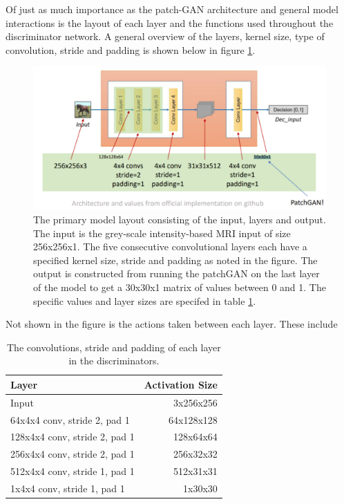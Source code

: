 \documentclass[12pt, fleqn, titlepage]{article}
\begin{document}
Of just as much importance as the patch-GAN architecture and general model interactions is the layout of each layer and the functions used throughout the discriminator network. A general overview of the layers, kernel size, type of convolution, stride and padding is shown below in figure \ref{fig:cyclegandiscriminatorlayers}.
\begin{figure}[H]
	\centering
	\includegraphics[width=0.7\linewidth]{imgs/cyclegan_discriminator_layers}
	\caption{The primary model layout consisting of the input, layers and output. The input is the grey-scale intensity-based MRI input of size 256x256x1. The five consecutive convolutional layers each have a specified kernel size, stride and padding as noted in the figure. The output is constructed from running the patchGAN on the last layer of the model to get a 30x30x1 matrix of values between 0 and 1. The specific values and layer sizes are specifed in table \ref{discriminator_layers}.} %
	\label{fig:cyclegandiscriminatorlayers}
\end{figure}

Not shown in the figure is the actions taken between each layer. These include 

\begin{table}[H]\label{discriminator_layers}
	\centering
	\begin{tabular}{lr}\toprule
		Layer                         & Activation Size \\ \midrule
		Input                         & 3x256x256       \\
		64x4x4 conv, stride 2, pad 1  & 64x128x128      \\
		128x4x4 conv, stride 2, pad 1 & 128x64x64       \\
		256x4x4 conv, stride 2, pad 1 & 256x32x32       \\
		512x4x4 conv, stride 1, pad 1 & 512x31x31       \\
		1x4x4 conv, stride 1, pad 1   & 1x30x30         \\ \bottomrule
	\end{tabular}
	\caption{The convolutions, stride and padding of each layer in the discriminators.}
\end{table}
\end{document}
